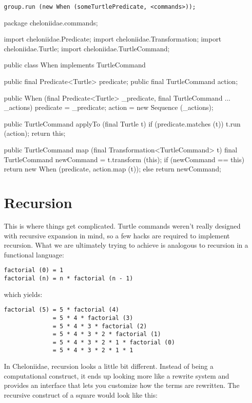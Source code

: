 \documentclass{report}
\begin{document}
\begin{verbatim}
group.run (new When (someTurtlePredicate, <commands>));
\end{verbatim}

\begin{javacode}
package cheloniidae.commands;

import cheloniidae.Predicate;
import cheloniidae.Transformation;
import cheloniidae.Turtle;
import cheloniidae.TurtleCommand;

public class When implements TurtleCommand {
  public final Predicate<Turtle> predicate;
  public final TurtleCommand     action;

  public When (final Predicate<Turtle> _predicate, final TurtleCommand ... _actions)
    {predicate = _predicate; action = new Sequence (_actions);}

  public TurtleCommand applyTo (final Turtle t) {
    if (predicate.matches (t)) t.run (action);
    return this;
  }

  public TurtleCommand map (final Transformation<TurtleCommand> t) {
    final TurtleCommand newCommand = t.transform (this);
    if (newCommand == this) return new When (predicate, action.map (t));
    else                    return newCommand;
  }
}
\end{javacode}

\section {Recursion} \label{sec:recursion}
      This is where things get complicated. Turtle commands weren't really designed with recursive expansion in mind, so a few hacks are required to implement
      recursion. What we are ultimately trying to achieve is analogous to recursion in a functional language:

\begin{verbatim}
factorial (0) = 1
factorial (n) = n * factorial (n - 1)
\end{verbatim}

      \noindent which yields:

\begin{verbatim}
factorial (5) = 5 * factorial (4)
              = 5 * 4 * factorial (3)
              = 5 * 4 * 3 * factorial (2)
              = 5 * 4 * 3 * 2 * factorial (1)
              = 5 * 4 * 3 * 2 * 1 * factorial (0)
              = 5 * 4 * 3 * 2 * 1 * 1
\end{verbatim}

      In Cheloniidae, recursion looks a little bit different. Instead of being a computational construct, it ends up looking more like a rewrite system and
      provides an interface that lets you customize how the terms are rewritten. The recursive construct of a square would look like this:
\end{document}
